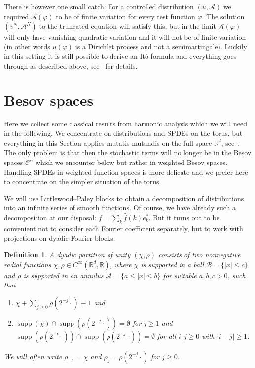 \documentclass[a4paper,11pt]{article}
\newcommand{\cdummy}{\cdot}
\newcommand{\nosymbol}{}
\newcommand{\tmop}[1]{\ensuremath{\operatorname{#1}}}
\newcommand{\tmtextit}[1]{{\itshape{#1}}}
\newtheorem{definition}{Definition}
{\theorembodyfont{\rmfamily}\newtheorem{example}{Example}}
{\theorembodyfont{\rmfamily\small\it}\newtheorem{exercise}{Exercise}}
\newcommand{\CA}{\mathscr{A}}
\newcommand{\CB}{\mathscr{B}}
\newcommand{\CC}{\mathscr{C}}
\begin{document}
\begin{remark}
   There is however one small catch: For a controlled distribution $(u, \mathcal{A})$ we required $\mathcal{A}(\varphi)$ to be of finite variation for every test function $\varphi$. The solution $(v^N, \mathcal{A}^N)$ to the truncated equation will satisfy this, but in the limit $\mathcal{A}(\varphi)$ will only have vanishing quadratic variation and it will not be of finite variation (in other words $u(\varphi)$ is a Dirichlet process and not a semimartingale). Luckily in this setting it is still possible to derive an It\^o formula and everything goes through as described above, see~\cite{gubinelli_regularization_2013} for details.
\end{remark}


\section{Besov spaces}\label{sec:preliminaries}

Here we collect some classical results from harmonic analysis which we will
need in the following. We concentrate on distributions and SPDEs on the torus,
but everything in this Section applies mutatis mutandis on the full space
$\mathbb{R}^d$, see~{\cite{Gubinelli2012}}. The only problem is that then the
stochastic terms will no longer be in the Besov spaces $\CC^{\alpha}$ which we
encounter below but rather in weighted Besov spaces. Handling SPDEs in weighted function spaces is more delicate and we prefer here to concentrate on the simpler situation of the torus.


We will use Littlewood--Paley blocks to obtain a decomposition of
distributions into an infinite series of smooth functions. Of course, we have
already such a decomposition at our disposal: $f = \sum_k \hat{f} (k)
e^{\ast}_k$. But it turns out to be convenient not to consider each Fourier
coefficient separately, but to work with projections on dyadic Fourier blocks.

\begin{definition}
  A \tmtextit{dyadic partition of unity} $(\chi,\rho)$ consists of two nonnegative radial
  functions $\chi, \rho \in C^{\infty} (\mathbb{R}^d, \mathbb{R})$, where
  $\chi$ is supported in a ball $\CB = \{ | x | \leqslant c \}$ and $\rho$ is
  supported in an annulus $\CA = \{ a \leqslant | x | \leqslant b \}$ for
  suitable $a, b, c > 0$, such that
  \begin{enumerate}
    \item $\chi + \sum_{j \geqslant 0} \rho (2^{- j} \cdummy) \equiv 1$ and
    
    \item \label{property-2-dyadic}$\tmop{supp} (\chi) \cap \tmop{supp} (\rho
    (2^{- j} \cdummy)) = \emptyset$ for $j \geqslant 1$ and $\tmop{supp} (\rho
    (2^{- i} \cdummy)) \cap \tmop{supp} (\rho (2^{- j} \nosymbol \cdummy))
    = \emptyset$ for all $i, j \geqslant 0$ with $| i - j | \geqslant 1$.
  \end{enumerate}
  We will often write $\rho_{- 1} = \chi$ and $\rho_j = \rho (2^{- j}
  \cdummy)$ for $j \geqslant 0$.
\end{definition}
\end{document}
